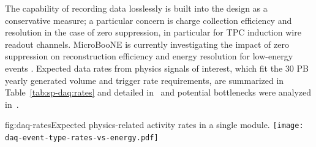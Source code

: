 The capability of recording data losslessly is built into the design
as a conservative measure; a particular concern is charge collection
efficiency and resolution in the case of zero suppression, in particular for TPC
induction wire readout channels.
MicroBooNE is currently investigating the impact of zero suppression
on reconstruction efficiency and energy resolution for low-energy
events \cite{bib:uBsnreadout2019}.
Expected data rates from physics signals of interest, which fit the 30 PB yearly generated volume and trigger rate requirements, are summarized in Table~\ref{tab:sp-daq:rates} and detailed in~ and potential bottlenecks were analyzed in~.

\begin{dunefigure}{fig:daq-rates}{Expected physics-related activity
    rates in a single \nominalmodsize module. \label{sec:fd-daq:rates}
}
  \texttt{[image: daq-event-type-rates-vs-energy.pdf]}
\end{dunefigure}


